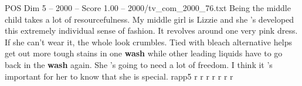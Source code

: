 \begin{textsample}{POS Dim 5 – 2000 – Score 1.00 – 2000/tv\_com\_2000\_76.txt}  \label{ex:f5_pos_062}
Being the middle child takes a lot of resourcefulness.
My middle girl is Lizzie and she 's developed this extremely individual sense of fashion.
It revolves around one very pink dress.
If she can't wear it, the whole look crumbles.
Tied with bleach alternative helps get out more tough stains in one \textbf{wash} while other leading liquids have to go back in the \textbf{wash} again.
She 's going to need a lot of freedom.
I think it 's important for her to know that she is special. rapp5 r r r r r r r

\end{textsample}
